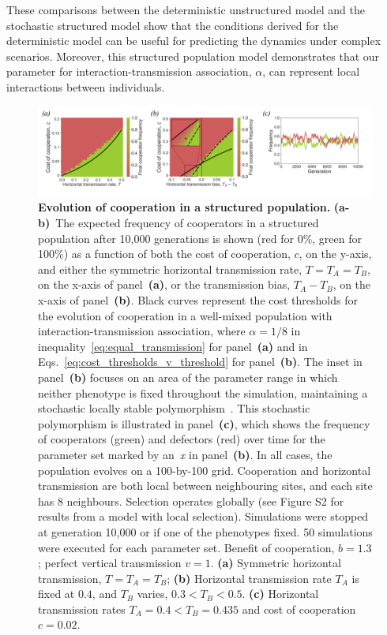 \documentclass[12pt]{extarticle}
\begin{document}
These comparisons between the deterministic unstructured model and the stochastic structured model show that the conditions derived for the deterministic model can be useful for predicting the dynamics under complex scenarios. 
Moreover, this structured population model demonstrates that our parameter for interaction-transmission association, $\alpha$, can represent local interactions between individuals.

\newpage

\begin{figure}[h]
  \centering
  \includegraphics[width=1\textwidth]{../PRSB_figures/fig_7.pdf}
  \caption{
  \textbf{Evolution of cooperation in a structured population.}
	\textbf{(a-b)}~The expected frequency of cooperators in a structured population after 10,000 generations is shown (red for 0\%, green for 100\%) as a function of both the cost of cooperation, $c$, on the y-axis, and either the symmetric horizontal transmission rate, $T=T_A=T_B$, on the x-axis of panel~\textbf{(a)}, or the transmission bias, $T_A-T_B$, on the x-axis of panel~\textbf{(b)}.
  Black curves represent the cost thresholds for the evolution of cooperation in a well-mixed population with interaction-transmission association, where $\alpha=1/8$ in inequality~\ref{eq:equal_transmission} for  panel~\textbf{(a)} and in Eqs.~\ref{eq:cost_thresholds_v_threshold} for panel~\textbf{(b)}.
	The inset in panel~\textbf{(b)} focuses on an area of the parameter range in which neither phenotype is fixed throughout the simulation, maintaining a stochastic locally stable polymorphism~\citep{Karlin1975}.
	This stochastic polymorphism is illustrated in panel~\textbf{(c)}, which shows the frequency of cooperators (green) and defectors (red) over time for the parameter set marked by an~\textit{x} in panel~\textbf{(b)}.
  In all cases, the population evolves on a 100-by-100 grid.
  Cooperation and horizontal transmission are both local between neighbouring sites, and each site has 8 neighbours.
  Selection operates globally (see Figure S2 for results from a model with local selection).
  Simulations were stopped at generation 10,000 or if one of the phenotypes fixed. 50 simulations were executed for each parameter set.
  Benefit of cooperation, $b=1.3$; perfect vertical transmission $v=1$.
  \textbf{(a)} Symmetric horizontal transmission, $T=T_A=T_B$;
  \textbf{(b)} Horizontal transmission rate $T_A$ is fixed at $0.4$, and $T_B$ varies, $0.3<T_B<0.5$.
  \textbf{(c)} Horizontal transmission rates $T_A = 0.4 < T_B = 0.435$ and cost of cooperation $c=0.02$.
  }
  \label{fig:spatial}
\end{figure}
\end{document}
